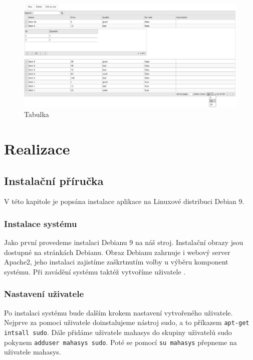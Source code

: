 \documentclass[thesis=B,czech]{FITthesis}[2012/06/26]
\begin{document}
\begin{figure}
	\includegraphics[width=500pt, height=0.8\textwidth, angle=90]{data_table.png}
	\caption{Tabulka}\label{tabulka}
\end{figure}
	

\chapter{Realizace}

\section{Instalační příručka}
	V této kapitole je popsána instalace aplikace na Linuxové distribuci Debian 9.
\subsection{Instalace systému}
	Jako první provedeme instalaci Debianu 9 na náš stroj. Instalační obrazy jsou dostupné na stránkách\cite{debian} Debianu. Obraz Debianu zahrnuje i webový server Apache2, jeho instalaci zajistíme zaškrtnutím volby  u výběru komponent systému. Při zavádění systému taktéž vytvoříme uživatele .
\subsection{Nastavení uživatele}
	Po instalaci systému bude dalším krokem nastavení vytvořeného uživatele. Nejprve za pomoci uživatele  doinstalujeme nástroj sudo, a to příkazem \verb|apt-get intsall sudo|. Dále přidáme uživatele mahasys do skupiny uživatelů sudo pokynem \verb|adduser mahasys sudo|. Poté se pomocí \verb|su mahasys| přepneme na uživatele mahasys.
\end{document}
